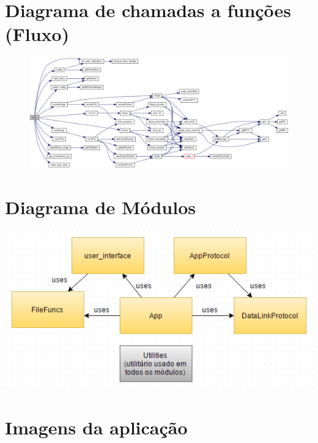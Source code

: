 \documentclass[11pt,a4paper,reqno]{report}
\numberwithin{equation}{section}
\begin{document}
\begin{appendices}
\chapter{Diagrama de chamadas a funções (Fluxo)}
\label{flux}
\begin{figure}
\centering
\includegraphics[width=26cm]{_app_8c_a3c04138a5bfe5d72780bb7e82a18e627_cgraph.png}
\end{figure}


\chapter{Diagrama de Módulos}
\label{modulediagram}
\centering
\includegraphics[width=15cm]{rcom_module_diagram.png}

\chapter{Imagens da aplicação}
\label{imagens_app}


\end{appendices}
\end{document}
